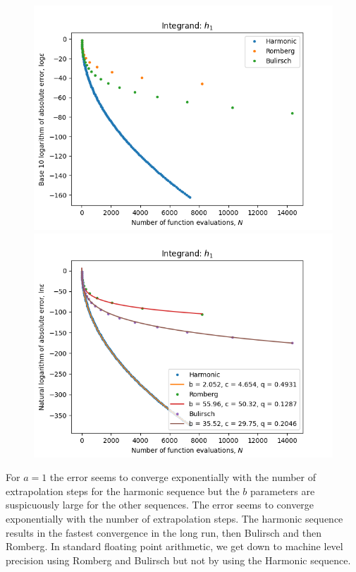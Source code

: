\begin{figure}[H]
\centering
\begin{minipage}{0.45\textwidth}
\centering
\includegraphics[scale=0.45]{romberg_plots/h_one_hp.png}
\end{minipage}
\begin{minipage}{0.45\textwidth}
\centering
\includegraphics[scale=0.45]{romberg_plots/h_one_hp_trend.png}
\end{minipage}
\end{figure}

For \(a = 1\) the error seems to converge exponentially with the number of extrapolation steps for the harmonic sequence but the \(b\) parameters are suspicuously large for the other sequences. The error seems to converge exponentially with the number of extrapolation steps. The harmonic sequence results in the fastest convergence in the long run, then Bulirsch and then Romberg. In standard floating point arithmetic, we get down to machine level precision using Romberg and Bulirsch but not by using the Harmonic sequence.

